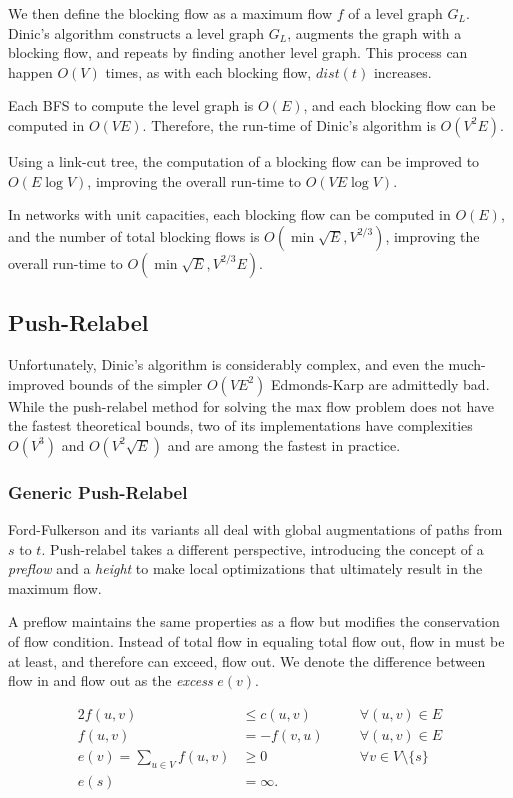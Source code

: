 We then define the blocking flow as a maximum flow $f$ of a level graph $G_L$. Dinic's algorithm constructs a level graph $G_L$, augments the graph with a blocking flow, and repeats by finding another level graph. This process can happen $O(V)$ times, as with each blocking flow, $dist(t)$ increases.

Each BFS to compute the level graph is $O(E)$, and each blocking flow can be computed in $O(VE)$. Therefore, the run-time of Dinic's algorithm is $O(V^2E)$.

Using a link-cut tree, the computation of a blocking flow can be improved to $O(E\log{V})$, improving the overall run-time to $O(VE\log{V})$.

In networks with unit capacities, each blocking flow can be computed in $O(E)$, and the number of total blocking flows is $O(\min{\sqrt{E}, V^{2/3}})$, improving the overall run-time to $O(\min{\sqrt{E}, V^{2/3}}E)$.

\subsection{Push-Relabel}

Unfortunately, Dinic's algorithm is considerably complex, and even the much-improved bounds of the simpler $O(VE^2)$ Edmonds-Karp are admittedly bad. While the push-relabel method for solving the max flow problem does not have the fastest theoretical bounds, two of its implementations have complexities $O(V^3)$ and $O(V^2\sqrt{E})$ and are among the fastest in practice.

\subsubsection{Generic Push-Relabel}

Ford-Fulkerson and its variants all deal with global augmentations of paths from $s$ to $t$. Push-relabel takes a different perspective, introducing the concept of a \textit{preflow} and a \textit{height} to make local optimizations that ultimately result in the maximum flow.

A preflow maintains the same properties as a flow but modifies the conservation of flow condition. Instead of total flow in equaling total flow out, flow in must be at least, and therefore can exceed, flow out. We denote the difference between flow in and flow out as the \textit{excess} $e(v)$.

\begin{alignat*}{2}
f(u,v) &\le c(u,v)   \quad && \forall (u,v) \in E \\
f(u,v) &= -f(v,u)   \quad && \forall (u,v) \in E \\
e(v) = \sum_{u \in V} f(u,v) &\ge 0   \quad && \forall v \in V \setminus \{s\} \\
e(s) &= \infty. \quad &&
\end{alignat*}

